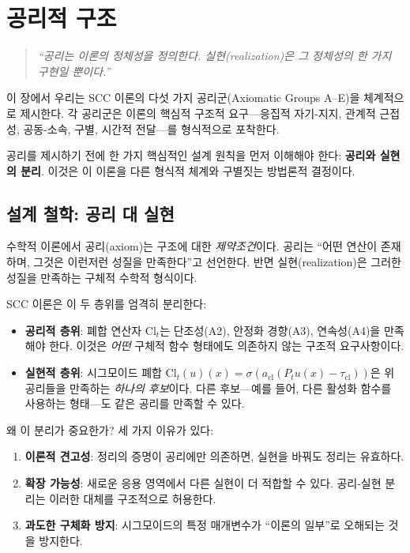 
\chapter{공리적 구조}
\label{ch:axioms}

\begin{quote}
\textit{``공리는 이론의 정체성을 정의한다. 실현(realization)은 그 정체성의 한 가지 구현일 뿐이다.''}
\end{quote}

이 장에서 우리는 SCC 이론의 다섯 가지 공리군(Axiomatic Groups A--E)을 체계적으로 제시한다. 각 공리군은 이론의 핵심적 구조적 요구---응집적 자기-지지, 관계적 근접성, 공동-소속, 구별, 시간적 전달---를 형식적으로 포착한다.

공리를 제시하기 전에 한 가지 핵심적인 설계 원칙을 먼저 이해해야 한다: \textbf{공리와 실현의 분리}. 이것은 이 이론을 다른 형식적 체계와 구별짓는 방법론적 결정이다.


\section{설계 철학: 공리 대 실현}
\label{sec:axiom-vs-realization}

수학적 이론에서 공리(axiom)는 구조에 대한 \emph{제약조건}이다. 공리는 ``어떤 연산이 존재하며, 그것은 이런저런 성질을 만족한다''고 선언한다. 반면 실현(realization)은 그러한 성질을 만족하는 구체적 수학적 형식이다.

SCC 이론은 이 두 층위를 엄격히 분리한다:

\begin{itemize}
    \item \textbf{공리적 층위}: 폐합 연산자 $\mathrm{Cl}_t$는 단조성(A2), 안정화 경향(A3), 연속성(A4)을 만족해야 한다. 이것은 \emph{어떤} 구체적 함수 형태에도 의존하지 않는 구조적 요구사항이다.
    \item \textbf{실현적 층위}: 시그모이드 폐합 $\mathrm{Cl}_t(u)(x) = \sigma(a_{\mathrm{cl}}(P_t u(x) - \tau_{\mathrm{cl}}))$은 위 공리들을 만족하는 \emph{하나의 후보}이다. 다른 후보---예를 들어, 다른 활성화 함수를 사용하는 형태---도 같은 공리를 만족할 수 있다.
\end{itemize}

왜 이 분리가 중요한가? 세 가지 이유가 있다:

\begin{enumerate}
    \item \textbf{이론적 견고성}: 정리의 증명이 공리에만 의존하면, 실현을 바꿔도 정리는 유효하다.
    \item \textbf{확장 가능성}: 새로운 응용 영역에서 다른 실현이 더 적합할 수 있다. 공리-실현 분리는 이러한 대체를 구조적으로 허용한다.
    \item \textbf{과도한 구체화 방지}: 시그모이드의 특정 매개변수가 ``이론의 일부''로 오해되는 것을 방지한다.
\end{enumerate}

